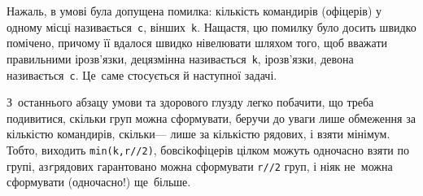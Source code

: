 \Tutorial
На\nolinebreak[3] жаль, в умові була допущена помилка: кількість командирів (офіцерів) у одному місці називається~\verb"c", в\nolinebreak[3] інших~\verb"k".
На\nolinebreak[3] щастя, цю помилку було досить швидко помічено, причому її вдалося швидко нівелювати шляхом того, щоб вважати правильними і\nolinebreak[3] розв'язки, де\nolinebreak[3] ця\nolinebreak[3] змінна називається~\verb"k", і\nolinebreak[3] розв'язки, де\nolinebreak[3] вона називається~\verb"c". Це~саме стосується й наступної задачі.

З~останнього абзацу умови та здорового глузду легко побачити, що треба подивитися, скільки груп можна сформувати, беручи до уваги лише обмеження за кількістю командирів, скільки\nolinebreak[3] --- лише за кількістю рядових, і взяти мінімум. Тобто, виходить \texttt{min(k,\nolinebreak[3] r//2)}, бо\nolinebreak[2] всі\nolinebreak[2] \texttt{k}\nolinebreak[2] офіцерів цілком можуть одночасно взяти по групі, а\nolinebreak[2] з\nolinebreak[2] \texttt{r}\nolinebreak[2] рядових гарантовано можна сформувати \texttt{r//2} груп, і ніяк не~можна сформувати (одночасно!) ще~більше. 